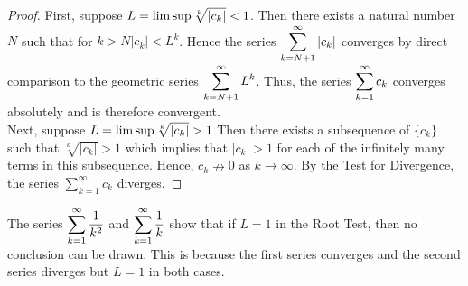 \documentclass[handout]{ximera}
\begin{document}
\begin{proof}
First, suppose $\displaystyle L = \limsup \sqrt[k]{|c_k|} < 1$. Then there exists a natural number $N$ such that for $k>N 
|c_k| < L^k$.  Hence the series $\displaystyle \sum_{k = N+1}^\infty |c_k|$ converges by direct comparison to the geometric series
$\displaystyle \sum_{k = N+1}^\infty L^k$. Thus, the series $\displaystyle\sum_{k = 1}^\infty c_k$ converges absolutely and is therefore convergent.\\
Next, suppose $\displaystyle L = \limsup \sqrt[k]{|c_k|} > 1$ Then there exists a subsequence of $\{c_k\}$ such that $\sqrt[k]{|c_k|} > 1$
which implies that $|c_k| > 1$ for each of the infinitely many terms in this subsequence. Hence, $c_k \nrightarrow 0$ as $k \to \infty$.
By the Test for Divergence, the series $\displaystyle \sum_{k=1}^\infty c_k$ diverges.
\end{proof}

\begin{remark}
The series $\displaystyle \sum_{k=1}^\infty \frac{1}{k^2}$ and $\displaystyle \sum_{k=1}^\infty \frac{1}{k}$ show that if $L = 1$ in the Root Test,
then no conclusion can be drawn. This is because the first series converges and the second series diverges but $L=1$ in both cases.
\end{remark}
\end{document}
